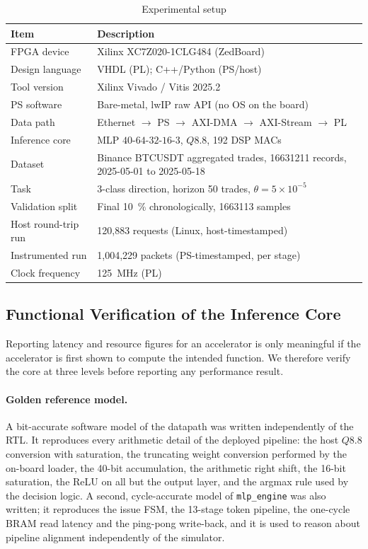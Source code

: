 \documentclass[final,5p,times,twocolumn]{elsarticle}
\begin{document}
\begin{table}[t]
\centering
\caption{Experimental setup}
\label{tab:experimental_setup}
\begin{tabular}{p{3.1cm} p{4.3cm}}
\toprule
Item & Description \\
\midrule
FPGA device & Xilinx XC7Z020-1CLG484 (ZedBoard) \\
Design language & VHDL (PL); C++/Python (PS/host) \\
Tool version & Xilinx Vivado / Vitis 2025.2 \\
PS software & Bare-metal, lwIP raw API (no OS on the board) \\
Data path & Ethernet $\to$ PS $\to$ AXI-DMA $\to$ AXI-Stream $\to$ PL \\
Inference core & MLP $40$-$64$-$32$-$16$-$3$, $Q8.8$, 192 DSP MACs \\
Dataset & Binance BTCUSDT aggregated trades, \num{16631211} records, 2025-05-01 to 2025-05-18 \\
Task & 3-class direction, horizon 50 trades, $\theta = 5\times10^{-5}$ \\
Validation split & Final \SI{10}{\percent} chronologically, \num{1663113} samples \\
Host round-trip run & 120{,}883 requests (Linux, host-timestamped) \\
Instrumented run & 1{,}004{,}229 packets (PS-timestamped, per stage) \\
Clock frequency & \SI{125}{\mega\hertz} (PL) \\
\bottomrule
\end{tabular}
\end{table}

\subsection{Functional Verification of the Inference Core}
\label{sec:verification}
Reporting latency and resource figures for an accelerator is only meaningful if
the accelerator is first shown to compute the intended function. We therefore
verify the core at three levels before reporting any performance result.

\paragraph{Golden reference model.}
A bit-accurate software model of the datapath was written independently of the
RTL. It reproduces every arithmetic detail of the deployed pipeline: the host
$Q8.8$ conversion with saturation, the truncating weight conversion performed by
the on-board loader, the 40-bit accumulation, the arithmetic right shift, the
16-bit saturation, the ReLU on all but the output layer, and the argmax rule
used by the decision logic. A second, cycle-accurate model of
\texttt{mlp\_engine} was also written; it reproduces the issue FSM, the 13-stage
token pipeline, the one-cycle BRAM read latency and the ping-pong write-back,
and it is used to reason about pipeline alignment independently of the
simulator.
\end{document}
